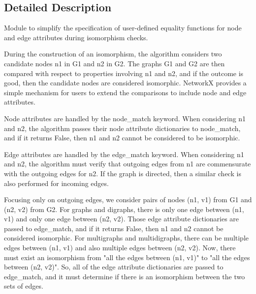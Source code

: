 \subsection{Detailed Description}
\begin{DoxyVerb}Module to simplify the specification of user-defined equality functions for
node and edge attributes during isomorphism checks.

During the construction of an isomorphism, the algorithm considers two
candidate nodes n1 in G1 and n2 in G2.  The graphs G1 and G2 are then
compared with respect to properties involving n1 and n2, and if the outcome
is good, then the candidate nodes are considered isomorphic. NetworkX
provides a simple mechanism for users to extend the comparisons to include
node and edge attributes.

Node attributes are handled by the node_match keyword. When considering
n1 and n2, the algorithm passes their node attribute dictionaries to
node_match, and if it returns False, then n1 and n2 cannot be
considered to be isomorphic.

Edge attributes are handled by the edge_match keyword. When considering
n1 and n2, the algorithm must verify that outgoing edges from n1 are
commensurate with the outgoing edges for n2. If the graph is directed,
then a similar check is also performed for incoming edges.

Focusing only on outgoing edges, we consider pairs of nodes (n1, v1) from
G1 and (n2, v2) from G2. For graphs and digraphs, there is only one edge
between (n1, v1) and only one edge between (n2, v2). Those edge attribute
dictionaries are passed to edge_match, and if it returns False, then
n1 and n2 cannot be considered isomorphic. For multigraphs and
multidigraphs, there can be multiple edges between (n1, v1) and also
multiple edges between (n2, v2).  Now, there must exist an isomorphism
from "all the edges between (n1, v1)" to "all the edges between (n2, v2)".
So, all of the edge attribute dictionaries are passed to edge_match, and
it must determine if there is an isomorphism between the two sets of edges.
\end{DoxyVerb}
 